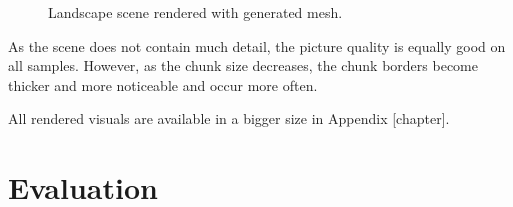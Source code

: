 \begin{figure}[h]
    \caption{Landscape scene rendered with generated mesh.}
\end{figure}

As the scene does not contain much detail, the picture quality is equally good on all samples. However, as the chunk size decreases, the chunk borders become thicker and more noticeable and occur more often.

All rendered visuals are available in a bigger size in Appendix [chapter].

\section{Evaluation}


